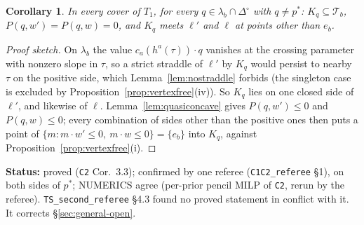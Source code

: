 \documentclass[11pt]{article}
\newtheorem{corollary}[theorem]{Corollary}
\theoremstyle{definition}
\theoremstyle{remark}
\newcommand{\Di}{\Delta^{\circ}}
\newcommand{\src}[1]{\texttt{#1}}
\newcommand{\status}[1]{\par\smallskip\noindent\textbf{Status:} #1\par\smallskip}
\begin{document}
\begin{corollary}\label{cor:chord}
In every cover of $T_1$, for every $q\in\lambda_b\cap\Di$ with $q\ne p^*$: $K_q\subseteq\mathcal T_b$, $P(q,w')=P(q,w)=0$, and $K_q$ meets $\ell'$ and $\ell$ at points other than $e_b$.
\end{corollary}
\begin{proof}[Proof sketch]
On $\lambda_b$ the value $c_a(h^a(\tau))\cdot q$ vanishes at the crossing parameter with nonzero slope in $\tau$, so a strict straddle of $\ell'$ by $K_q$ would persist to nearby $\tau$ on the positive side, which Lemma~\ref{lem:nostraddle} forbids (the singleton case is excluded by Proposition~\ref{prop:vertexfree}(iv)). So $K_q$ lies on one closed side of $\ell'$, and likewise of $\ell$. Lemma~\ref{lem:quasiconcave} gives $P(q,w')\le0$ and $P(q,w)\le0$; every combination of sides other than the positive ones then puts a point of $\{m:m\cdot w'\le0,\ m\cdot w\le0\}=\{e_b\}$ into $K_q$, against Proposition~\ref{prop:vertexfree}(i).
\end{proof}
\status{proved (\src{C2} Cor.~3.3); confirmed by one referee (\src{C1C2\_referee} \S1), on both sides of $p^*$; NUMERICS agree (per-prior pencil MILP of \src{C2}, rerun by the referee). \src{TS\_second\_referee} \S4.3 found no proved statement in conflict with it. It corrects \S\ref{sec:general-open}.}
\end{document}
